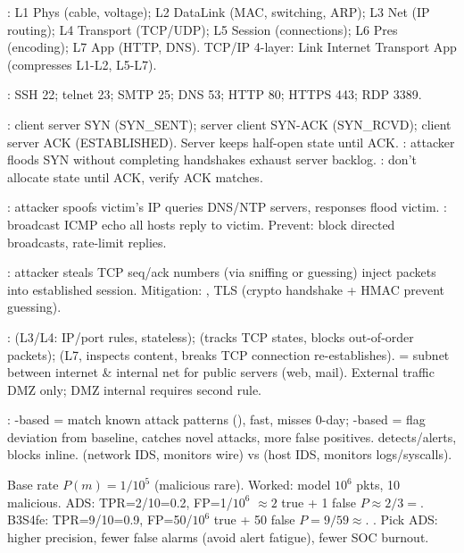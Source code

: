 
: L1 Phys (cable, voltage); L2 DataLink (MAC, switching, ARP); L3 Net (IP routing); L4 Transport (TCP/UDP); L5 Session (connections); L6 Pres (encoding); L7 App (HTTP, DNS). TCP/IP 4-layer: Link \to Internet \to Transport \to App (compresses L1-L2, L5-L7).

: SSH 22; telnet 23; SMTP 25; DNS 53; HTTP 80; HTTPS 443; RDP 3389. 

: client \to server SYN (SYN\_SENT); server \to client SYN-ACK (SYN\_RCVD); client \to server ACK (ESTABLISHED). Server keeps half-open state until ACK. : attacker floods SYN without completing handshakes \to exhaust server backlog. : don't allocate state until ACK, verify ACK matches.

: attacker spoofs victim's IP \to queries DNS/NTP servers, responses flood victim. : broadcast ICMP echo \to all hosts reply to victim. Prevent: block directed broadcasts, rate-limit replies.

: attacker steals TCP seq/ack numbers (via sniffing or guessing) \to inject packets into established session. Mitigation: , TLS (crypto handshake + HMAC prevent guessing).

:  (L3/L4: IP/port rules, stateless);  (tracks TCP states, blocks out-of-order packets);  (L7, inspects content, breaks TCP connection \to re-establishes).  = subnet between internet \& internal net for public servers (web, mail). External traffic \to DMZ only; DMZ \to internal requires second rule.

: -based = match known attack patterns (), fast, misses 0-day; -based = flag deviation from baseline, catches novel attacks, more false positives.  detects/alerts,  blocks inline.  (network IDS, monitors wire) vs  (host IDS, monitors logs/syscalls).

 \fivept
\noindent{}\par
Base rate $P(m)=1/10^{5}$ (malicious rare). Worked: model $10^{6}$ pkts, 10 malicious. ADS: TPR=2/10=0.2, FP=1/$10^6$ \to $\approx 2$ true + 1 false \to $P\approx 2/3=$. B3S4fe: TPR=9/10=0.9, FP=50/$10^6$  true + 50 false \to $P=9/59\approx$. . Pick ADS: higher precision, fewer false alarms (avoid alert fatigue), fewer SOC burnout.

